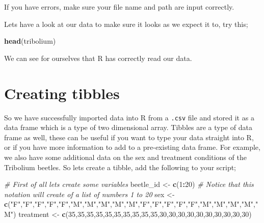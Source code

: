 \documentclass[
]{book}
\newenvironment{Shaded}{\begin{snugshade}}{\end{snugshade}}
\newcommand{\CommentTok}[1]{\textcolor[rgb]{0.56,0.35,0.01}{\textit{#1}}}
\newcommand{\DecValTok}[1]{\textcolor[rgb]{0.00,0.00,0.81}{#1}}
\newcommand{\FunctionTok}[1]{\textcolor[rgb]{0.13,0.29,0.53}{\textbf{#1}}}
\newcommand{\NormalTok}[1]{#1}
\newcommand{\OtherTok}[1]{\textcolor[rgb]{0.56,0.35,0.01}{#1}}
\newcommand{\SpecialCharTok}[1]{\textcolor[rgb]{0.81,0.36,0.00}{\textbf{#1}}}
\newcommand{\StringTok}[1]{\textcolor[rgb]{0.31,0.60,0.02}{#1}}
\begin{document}
If you have errors, make sure your file name and path are input correctly.

Lets have a look at our data to make sure it looks as we expect it to, try this;

\begin{Shaded}
\begin{Highlighting}[]
\FunctionTok{head}\NormalTok{(tribolium)}
\end{Highlighting}
\end{Shaded}

We can see for ourselves that R has correctly read our data.

\hypertarget{creating-tibbles}{%
\section{Creating tibbles}\label{creating-tibbles}}

So we have successfully imported data into R from a \texttt{.csv} file and stored it as a data frame which is a type of two dimensional array. Tibbles are a type of data frame as well, these can be useful if you want to type your data straight into R, or if you have more information to add to a pre-existing data frame. For example, we also have some additional data on the sex and treatment conditions of the Tribolium beetles. So lets create a tibble, add the following to your script;

\begin{Shaded}
\begin{Highlighting}[]
\CommentTok{\# First of all lets create some variables}
\NormalTok{beetle\_id }\OtherTok{\textless{}{-}} \FunctionTok{c}\NormalTok{(}\DecValTok{1}\SpecialCharTok{:}\DecValTok{20}\NormalTok{) }\CommentTok{\# Notice that this notation will create of a list of numbers 1 to 20}
\NormalTok{sex }\OtherTok{\textless{}{-}} \FunctionTok{c}\NormalTok{(}\StringTok{"F"}\NormalTok{,}\StringTok{"F"}\NormalTok{,}\StringTok{"F"}\NormalTok{,}\StringTok{"F"}\NormalTok{,}\StringTok{"F"}\NormalTok{,}\StringTok{"M"}\NormalTok{,}\StringTok{"M"}\NormalTok{,}\StringTok{"M"}\NormalTok{,}\StringTok{"M"}\NormalTok{,}\StringTok{"M"}\NormalTok{,}\StringTok{"F"}\NormalTok{,}\StringTok{"F"}\NormalTok{,}\StringTok{"F"}\NormalTok{,}\StringTok{"F"}\NormalTok{,}\StringTok{"F"}\NormalTok{,}\StringTok{"M"}\NormalTok{,}\StringTok{"M"}\NormalTok{,}\StringTok{"M"}\NormalTok{,}\StringTok{"M"}\NormalTok{,}\StringTok{"M"}\NormalTok{)}
\NormalTok{treatment }\OtherTok{\textless{}{-}} \FunctionTok{c}\NormalTok{(}\DecValTok{35}\NormalTok{,}\DecValTok{35}\NormalTok{,}\DecValTok{35}\NormalTok{,}\DecValTok{35}\NormalTok{,}\DecValTok{35}\NormalTok{,}\DecValTok{35}\NormalTok{,}\DecValTok{35}\NormalTok{,}\DecValTok{35}\NormalTok{,}\DecValTok{35}\NormalTok{,}\DecValTok{35}\NormalTok{,}\DecValTok{30}\NormalTok{,}\DecValTok{30}\NormalTok{,}\DecValTok{30}\NormalTok{,}\DecValTok{30}\NormalTok{,}\DecValTok{30}\NormalTok{,}\DecValTok{30}\NormalTok{,}\DecValTok{30}\NormalTok{,}\DecValTok{30}\NormalTok{,}\DecValTok{30}\NormalTok{,}\DecValTok{30}\NormalTok{)}
\end{Highlighting}
\end{Shaded}
\end{document}
